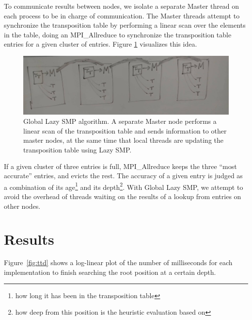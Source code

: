 \documentclass{article}
\begin{document}
To communicate results between nodes,
we isolate a separate Master thread on each process to be in charge of
communication. The Master threads attempt to synchronize the transposition table
by performing a linear scan over the elements in the table, doing an
{MPI\_Allreduce} to synchronize the transposition table entries for a given
cluster of entries. Figure \ref{fig:diagram} visualizes this idea.

\begin{figure}[t]
	\includegraphics[width=\textwidth]{diagram}
	\caption{Global Lazy SMP algorithm. A separate Master node performs a
	linear scan of the transposition table and sends information to other
	master nodes, at the same time that local threads are updating the
	transposition table using Lazy SMP.}
	\label{fig:diagram}
\end{figure}

If a given cluster of three entries is full, {MPI\_Allreduce}
keeps the three ``most accurate'' entries, and evicts the rest. The accuracy of
a given entry is judged as a combination of its age\footnote{how long it has
been in the transposition table} and its depth\footnote{how deep from this
position is the heuristic evaluation based on}. With Global Lazy SMP, we
attempt to avoid the overhead of threads waiting on the results of a lookup from
entries on other nodes.

\section{Results}\label{Results}
Figure~\ref{fig:ttd} shows a log-linear plot of the number of milliseconds for
each implementation to finish searching the root position at a certain depth. 
\end{document}
